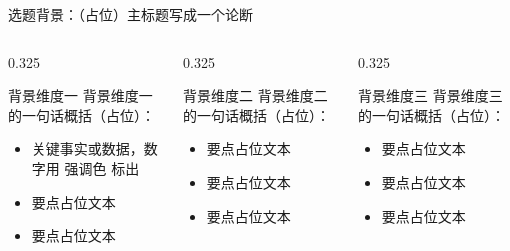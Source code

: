 \documentclass[aspectratio=169,11pt]{beamer}
\begin{document}
\begin{frame}{选题背景：（占位）主标题写成一个论断}
  \small
  \begin{columns}[T]
    \begin{column}{0.325\textwidth}
      \begin{card}{背景维度一}
        \footnotesize
        背景维度一的一句话概括（占位）：
        \begin{itemize}
          \item 关键事实或数据，数字用 \textcolor{accent}{强调色} 标出
          \item 要点占位文本
          \item 要点占位文本
        \end{itemize}
      \end{card}
    \end{column}
    \begin{column}{0.325\textwidth}
      \begin{card}{背景维度二}
        \footnotesize
        背景维度二的一句话概括（占位）：
        \begin{itemize}
          \item 要点占位文本
          \item 要点占位文本
          \item 要点占位文本
        \end{itemize}
      \end{card}
    \end{column}
    \begin{column}{0.325\textwidth}
      \begin{card}{背景维度三}
        \footnotesize
        背景维度三的一句话概括（占位）：
        \begin{itemize}
          \item 要点占位文本
          \item 要点占位文本
          \item 要点占位文本
        \end{itemize}
      \end{card}
    \end{column}
  \end{columns}
\end{frame}
\end{document}
